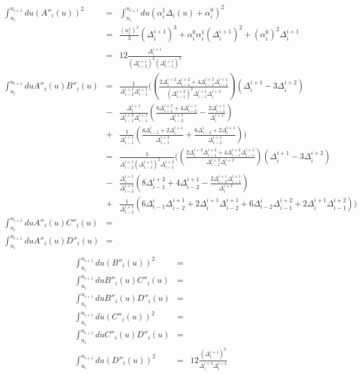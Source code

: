 \documentclass[a4paper,10pt,twosided]{article}
\begin{document}
\begin{eqnarray*}
          \int_{u_i}^{u_{i+1}} du \left( A''_i(u) \right)^2  & = &
          \int_{u_i}^{u_{i+1}} du \left( \alpha_i^1 \Delta_i(u)+\alpha_i^0 \right)^2  
          \\ & = & \frac{(\alpha_i^1)^2}{3} (\Delta_i^{i+1})^3+\alpha_i^0\alpha_i^1 (\Delta_i^{i+1})^2+(\alpha_i^0)^2 \Delta_i^{i+1}
          \\ &=&12 \frac{ \Delta_i^{i+1} }{ \left(\Delta_{i-2}^{i+1}\right)^2\left(\Delta_{i-1}^{i+1}\right)^2 }
\\        \int_{u_i}^{u_{i+1}} du  A''_i(u) B''_i(u)       & = & \frac{1}{\Delta_{i-2}^{i+1}\Delta_{i-1}^{i+1}}
    (   \left( \frac{2\Delta_i^{i+2}\Delta_{i-1}^{i+2} + 4\Delta_{i-1}^{i+2}\Delta_{i-1}^{i+1}}{(\Delta_{i-1}^{i+2})^2\Delta_{i-1}^{i+1}\Delta_i^{i+2}} \right)\left(\Delta_i^{i+1} -3\Delta_i^{i+2} \right)
  \\     & - &  \frac{\Delta_i^{i+1}}{\Delta_{i-1}^{i+2}\Delta_{i-1}^{i+1} }  \left( \frac{8\Delta_{i-1}^{i+2}+4\Delta_{i-2}^{i+1}}{\Delta_{i-2}^{i+1}} 
           -    \frac{  2 \Delta_{i-1}^{i+1} }{\Delta_i^{i+2}} \right)
  \\     & + &\frac{1}{\Delta_{i-1}^{i+1}} \left(  \frac{  6\Delta_{i-1}^i+2\Delta_i^{i+1} }{\Delta_{i-1}^{i+2}}
           +    \frac{  6\Delta_{i-2}^i+2\Delta_i^{i+1} }{\Delta_{i-2}^{i+1}} \right) )
\\                                                           & = & \frac{1}{\Delta_{i-2}^{i+1}(\Delta_{i-1}^{i+1})^2\Delta_{i-1}^{i+2}}
    (   \left( \frac{2\Delta_i^{i+2}\Delta_{i-1}^{i+2} + 4\Delta_{i-1}^{i+2}\Delta_{i-1}^{i+1}}{\Delta_{i-1}^{i+2}\Delta_i^{i+2}} \right)\left(\Delta_i^{i+1} -3\Delta_i^{i+2} \right)
  \\     & - &  \frac{\Delta_i^{i+1}}{\Delta_{i-2}^{i+1} }  \left( 8\Delta_{i-1}^{i+2}+4\Delta_{i-2}^{i+1}
           -    \frac{  2 \Delta_{i-2}^{i+1}\Delta_{i-1}^{i+1} }{\Delta_i^{i+2}} \right)
  \\     & + &\frac{1}{\Delta_{i-2}^{i+1}} \left(   6\Delta_{i-1}^i\Delta_{i-2}^{i+1}+2\Delta_i^{i+1}\Delta_{i-2}^{i+1}
           +      6\Delta_{i-2}^i\Delta_{i-1}^{i+2}+2\Delta_i^{i+1}\Delta_{i-1}^{i+2} \right) )
\\        \int_{u_i}^{u_{i+1}} du  A''_i(u) C''_i(u)         & = &
\\        \int_{u_i}^{u_{i+1}} du  A''_i(u) D''_i(u)         & = &
\end{eqnarray*}
\begin{eqnarray*}
\\        \int_{u_i}^{u_{i+1}} du \left( B''_i(u) \right)^2  & = &
\\        \int_{u_i}^{u_{i+1}} du  B''_i(u) C''_i(u)         & = &
\\        \int_{u_i}^{u_{i+1}} du  B''_i(u) D''_i(u)         & = &
\\        \int_{u_i}^{u_{i+1}} du \left( C''_i(u) \right)^2  & = &
\\        \int_{u_i}^{u_{i+1}} du  C''_i(u) D''_i(u)         & = &
\\        \int_{u_i}^{u_{i+1}} du \left( D''_i(u) \right)^2  & = & 12 \frac{ (\Delta_i^{i+1})^2 }{ \Delta_i^{i+3}\Delta_i^{i+2} }
\end{eqnarray*}
\end{document}
